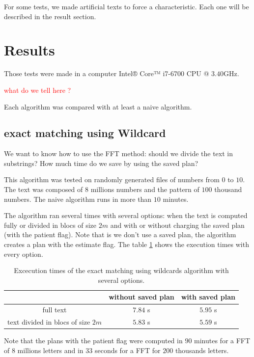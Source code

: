 \documentclass[preprint,12pt]{elsarticle}
\begin{document}
For some tests, we made artificial texts to force a characteristic.
Each one will be described in the result section.




\section{Results}
\label{Res}

Those tests were made in a computer Intel® Core™ i7-6700 CPU @ $3.40$GHz.

\textcolor{red}{what do we tell here ?}

Each algorithm was compared with at least a naive algorithm.





\subsection{exact matching using Wildcard}
\label{WCTests}

We want to know how to use the FFT method:
should we divide the text in substrings?
How much time do we save by using the saved plan?

This algorithm was tested on randomly generated files of numbers from $0$ to $10$.
The text was composed of $8$ millions numbers and the pattern of $100$ thousand numbers.
The naive algorithm runs in more than $10$ minutes.

The algorithm ran several times with several options:
when the text is computed fully or divided in blocs of size $2m$
and with or without charging the saved plan (with the patient flag).
Note that is we don't use a saved plan, the algorithm creates a plan with the estimate flag.
The table \ref{TableWC} shows the execution times with every option.

\begin{table}[h]
\begin{tabular}{|c|c|c|}
\hline
			& without saved plan & with saved plan \\ \hline
full text	& $7.84$ s & $5.95$ s \\ \hline
text divided in blocs of size $2m$ &  $5.83$ s & $5.59$ s \\ \hline
\end{tabular}
\caption{Excecution times of the exact matching using wildcards algorithm with several options.}
\label{TableWC}
\end{table}


Note that the plans with the patient flag were computed in
$90$ minutes for a FFT of $8$ millions letters
and in $33$ seconds for a FFT for $200$ thousands letters.
\end{document}
